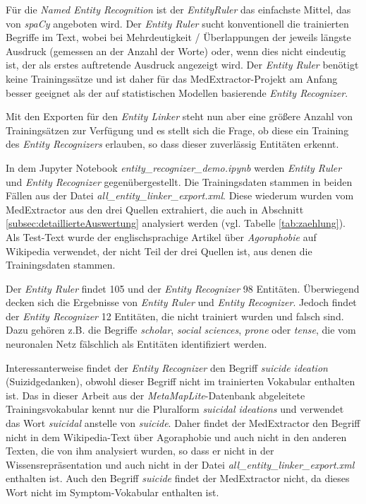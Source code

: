 Für die \emph{Named Entity Recognition} ist der \emph{EntityRuler} das einfachste Mittel, das von \emph{spaCy} angeboten wird. Der \emph{Entity Ruler} sucht konventionell die trainierten Begriffe im Text, wobei bei Mehrdeutigkeit / Überlappungen der jeweils längste Ausdruck (gemessen an der Anzahl der Worte) oder, wenn dies nicht eindeutig ist, der als erstes auftretende Ausdruck angezeigt wird. Der \emph{Entity Ruler} benötigt keine Trainingssätze und ist daher für das MedExtractor-Projekt am Anfang besser geeignet als der auf statistischen Modellen basierende \emph{Entity Recognizer}.

Mit den Exporten für den \emph{Entity Linker} steht nun aber eine größere Anzahl von Trainingsätzen zur Verfügung und es stellt sich die Frage, ob diese ein Training des \emph{Entity Recognizers} erlauben, so dass dieser zuverlässig Entitäten erkennt.

In dem Jupyter Notebook \emph{entity\_recognizer\_demo.ipynb} werden \emph{Entity Ruler} und \emph{Entity Recognizer} gegenübergestellt. Die Trainingsdaten stammen in beiden Fällen aus der Datei \emph{all\_entity\_linker\_export.xml}. Diese wiederum wurden vom MedExtractor aus den drei Quellen extrahiert, die auch in Abschnitt \ref{subsec:detaillierteAuswertung} analysiert werden (vgl. Tabelle \ref{tab:zaehlung}). Als Test-Text wurde der englischsprachige Artikel über \emph{Agoraphobie} auf Wikipedia verwendet, der nicht Teil der drei Quellen ist, aus denen die Trainingsdaten stammen.

Der \emph{Entity Ruler} findet 105 und der \emph{Entity Recognizer} 98 Entitäten. Überwiegend decken sich die Ergebnisse von \emph{Entity Ruler} und \emph{Entity Recognizer}. Jedoch findet der \emph{Entity Recognizer} 12 Entitäten, die nicht trainiert wurden und falsch sind. Dazu gehören z.B. die Begriffe \emph{scholar}, \emph{social sciences}, \emph{prone} oder \emph{tense}, die vom neuronalen Netz fälschlich als Entitäten identifiziert werden.

Interessanterweise findet der \emph{Entity Recognizer} den Begriff \emph{suicide ideation} (Suizidgedanken), obwohl dieser Begriff nicht im trainierten Vokabular enthalten ist. Das in dieser Arbeit aus der \emph{MetaMapLite}-Datenbank abgeleitete Trainingsvokabular kennt nur die Pluralform \emph{suicidal ideations} und verwendet das Wort \emph{suicidal} anstelle von \emph{suicide}. Daher findet der MedExtractor den Begriff nicht in dem Wikipedia-Text über Agoraphobie und auch nicht in den anderen Texten, die von ihm analysiert wurden, so dass er nicht in der Wissensrepräsentation und auch nicht in der Datei \emph{all\_entity\_linker\_export.xml} enthalten ist. Auch den Begriff \emph{suicide} findet der MedExtractor nicht, da dieses Wort nicht im Symptom-Vokabular enthalten ist.

